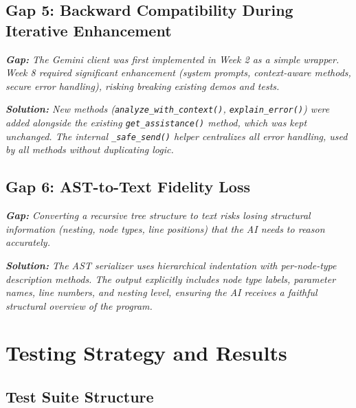 \documentclass[a4paper,11pt]{article}
\newcommand{\gap}[1]{\textit{\textbf{Gap:} #1}}
\newcommand{\solution}[1]{\textit{\textbf{Solution:} #1}}
\begin{document}
\subsection{Gap 5: Backward Compatibility During Iterative Enhancement}

\gap{The Gemini client was first implemented in Week 2 as a simple wrapper. Week 8 required significant enhancement (system prompts, context-aware methods, secure error handling), risking breaking existing demos and tests.}

\solution{New methods (\texttt{analyze\_with\_context()}, \texttt{explain\_error()}) were added alongside the existing \texttt{get\_assistance()} method, which was kept unchanged. The internal \texttt{\_safe\_send()} helper centralizes all error handling, used by all methods without duplicating logic.}

\subsection{Gap 6: AST-to-Text Fidelity Loss}

\gap{Converting a recursive tree structure to text risks losing structural information (nesting, node types, line positions) that the AI needs to reason accurately.}

\solution{The AST serializer uses hierarchical indentation with per-node-type description methods. The output explicitly includes node type labels, parameter names, line numbers, and nesting level, ensuring the AI receives a faithful structural overview of the program.}


\section{Testing Strategy and Results}

\subsection{Test Suite Structure}
\end{document}
